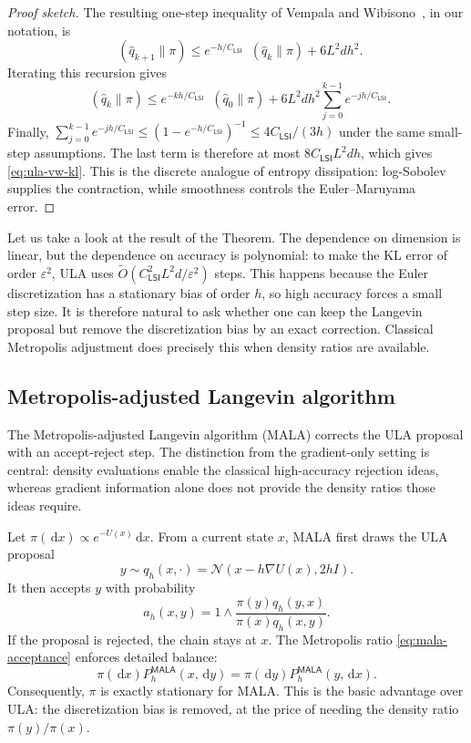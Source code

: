\documentclass[10pt,a4paper]{amsart}
\numberwithin{equation}{section}
\DeclareMathOperator{\KL}{D_{\mathsf{KL}}}
\newcommand{\dd}{\,\mathrm{d}}
\newcommand{\Id}{I}
\newcommand{\wh}[1]{\widehat{#1}}
\newcommand{\deltaerr}{\varepsilon}
\newcommand{\normal}[2]{\mathcal{N}\!\left(#1,#2\right)}
\newcommand{\tO}{\widetilde O}
\begin{document}
\begin{proof}[Proof sketch]
The resulting one-step inequality of Vempala and
Wibisono~\cite{vempala2019rapidula}, in our notation, is
\[
    \KL(\wh q_{k+1}\|\pi)
    \leq
    e^{-h/C_{\mathsf{LSI}}}\KL(\wh q_k\|\pi)
    +6L^2dh^2.
\]
Iterating this recursion gives
\[
    \KL(\wh q_k\|\pi)
    \leq
    e^{-kh/C_{\mathsf{LSI}}}\KL(\wh q_0\|\pi)
    +
    6L^2dh^2
    \sum_{j=0}^{k-1} e^{-jh/C_{\mathsf{LSI}}}.
\]
Finally,
$\sum_{j=0}^{k-1}e^{-jh/C_{\mathsf{LSI}}}
\leq (1-e^{-h/C_{\mathsf{LSI}}})^{-1}
 \leq 4C_{\mathsf{LSI}}/(3h)$ under the same small-step assumptions.  The
last term is therefore at most $8C_{\mathsf{LSI}}L^2dh$, which gives
\eqref{eq:ula-vw-kl}.  This is the
discrete analogue of entropy dissipation: log-Sobolev supplies the contraction,
while smoothness controls the Euler--Maruyama error.
\end{proof}

Let us take a look at the result of the Theorem. The dependence on
dimension is linear, but the dependence on accuracy is polynomial:
to make the KL error of order $\deltaerr^2$, ULA uses
$\tO(C_{\mathsf{LSI}}^2L^2d/\deltaerr^2)$ steps.  This happens because the
Euler discretization has a stationary bias of order $h$, so high accuracy
forces a small step size.  It is therefore natural to ask whether one can keep
the Langevin proposal but remove the discretization bias by an exact correction.
Classical Metropolis adjustment does precisely this when density ratios are
available.

\subsection{Metropolis-adjusted Langevin algorithm}

The Metropolis-adjusted Langevin algorithm (MALA) corrects the ULA proposal with
an accept-reject step.  The distinction from the gradient-only setting is central:
density evaluations enable the classical high-accuracy rejection ideas, whereas
gradient information alone does not provide the density ratios those ideas
require.

Let $\pi(\dd x)\propto e^{-U(x)}\dd x$.  From a current state $x$, MALA first
draws the ULA proposal
\[
    y\sim q_h(x,\cdot)
    =
    \normal{x-h\nabla U(x)}{2h\Id}.
\]
It then accepts $y$ with probability
\begin{equation}\label{eq:mala-acceptance}
    a_h(x,y)
    =
    1\wedge
    \frac{\pi(y)q_h(y,x)}{\pi(x)q_h(x,y)}.
\end{equation}
If the proposal is rejected, the chain stays at $x$.  The Metropolis ratio
\eqref{eq:mala-acceptance} enforces detailed balance:
\[
    \pi(\dd x)P_h^{\mathsf{MALA}}(x,\dd y)
    =
    \pi(\dd y)P_h^{\mathsf{MALA}}(y,\dd x).
\]
Consequently, $\pi$ is exactly stationary for MALA\@.  This is the basic
advantage over ULA: the discretization bias is removed, at the price of needing
the density ratio $\pi(y)/\pi(x)$.
\end{document}
